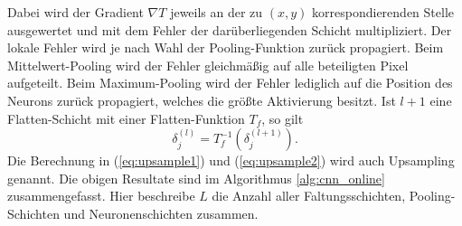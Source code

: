 Dabei wird der Gradient $\nabla T$ jeweils an der zu $(x,y)$ korrespondierenden Stelle ausgewertet und mit dem Fehler der darüberliegenden Schicht multipliziert.
Der lokale Fehler wird je nach Wahl der Pooling-Funktion zurück propagiert. Beim Mittelwert-Pooling wird der Fehler gleichmäßig auf alle beteiligten Pixel aufgeteilt. Beim Maximum-Pooling wird der Fehler lediglich auf die Position des Neurons zurück propagiert, welches die größte Aktivierung besitzt.
Ist $l+1$ eine Flatten-Schicht mit einer Flatten-Funktion $T_f$, so gilt
\begin{equation}
    \label{eq:upsample2}
    \delta_j^{(l)}=T^{-1}_f(\delta_j^{(l+1)}).
\end{equation}
Die Berechnung in (\ref{eq:upsample1}) und (\ref{eq:upsample2}) wird auch Upsampling genannt. Die obigen Resultate sind im Algorithmus \ref{alg:cnn_online} zusammengefasst. Hier beschreibe $L$ die Anzahl aller Faltungsschichten, Pooling-Schichten und Neuronenschichten zusammen.

